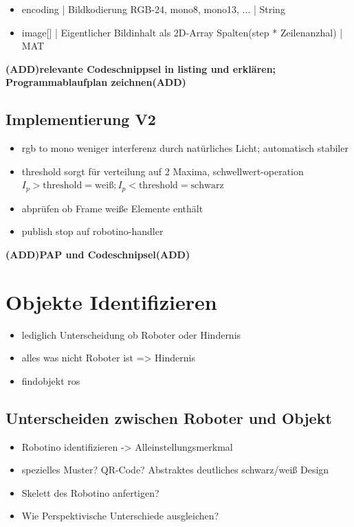 		 \begin{itemize}
		 \item encoding | Bildkodierung RGB-24, mono8, mono13, ... | String\\ 
		 \item image[] | Eigentlicher Bildinhalt als 2D-Array Spalten(step * Zeilenanzhal) | MAT\\ 
		 \end{itemize}
		\textbf{(ADD)relevante Codeschnippsel in listing und erklären; Programmablaufplan zeichnen(ADD)}
						
		\subsection{Implementierung V2}
		\begin{itemize}
		\item rgb to mono weniger interferenz durch natürliches Licht; automatisch stabiler
		\item threshold sorgt für verteilung auf 2 Maxima, schwellwert-operation $I_p > \text{threshold} = \text{weiß}; I_p < \text{threshold} = \text{schwarz}$
		\item abprüfen ob Frame weiße Elemente enthält
		\item publish stop auf robotino-handler
		\end{itemize}
		\textbf{(ADD)PAP und Codeschnipsel(ADD)}			
		\section{Objekte Identifizieren}
		\begin{itemize}
		\item lediglich Unterscheidung ob Roboter oder Hindernis
		\item alles was nicht Roboter ist => Hindernis
		\item findobjekt ros
		\end{itemize}
			\subsection{Unterscheiden zwischen Roboter und Objekt}
			\begin{itemize}
			\item Robotino identifizieren -> Alleinstellungsmerkmal
			\item spezielles Muster? QR-Code? Abstraktes deutliches schwarz/weiß Design
			\item Skelett des Robotino anfertigen?
			\item Wie Perspektivische Unterschiede ausgleichen?
			\end{itemize}
		
